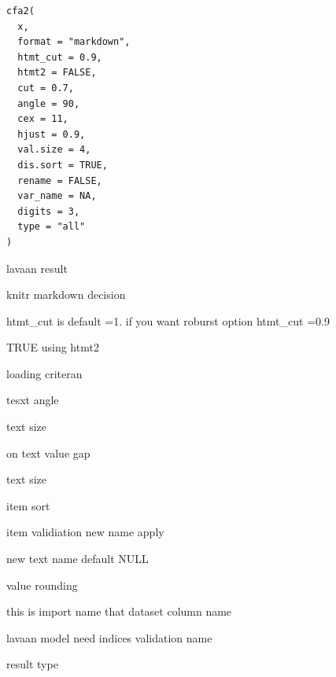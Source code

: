 \documentclass[a4paper]{book}
\begin{document}
%
\begin{Usage}
\begin{verbatim}
cfa2(
  x,
  format = "markdown",
  htmt_cut = 0.9,
  htmt2 = FALSE,
  cut = 0.7,
  angle = 90,
  cex = 11,
  hjust = 0.9,
  val.size = 4,
  dis.sort = TRUE,
  rename = FALSE,
  var_name = NA,
  digits = 3,
  type = "all"
)
\end{verbatim}
\end{Usage}
%
\begin{Arguments}
\begin{ldescription}
\item[\code{x}] lavaan result

\item[\code{format}] knitr markdown decision

\item[\code{htmt\_cut}] htmt\_cut is default =1.
if you want roburst option htmt\_cut =0.9

\item[\code{htmt2}] TRUE using htmt2

\item[\code{cut}] loading criteran

\item[\code{angle}] tesxt angle

\item[\code{cex}] text size

\item[\code{hjust}] on text value gap

\item[\code{val.size}] text size

\item[\code{dis.sort}] item sort

\item[\code{rename}] item validiation new name apply

\item[\code{var\_name}] new text name default NULL

\item[\code{digits}] value rounding

\item[\code{dataset}] this is import name that dataset column name

\item[\code{model}] lavaan model need indices validation name

\item[\code{res}] result type
\end{ldescription}
\end{Arguments}
\end{document}
